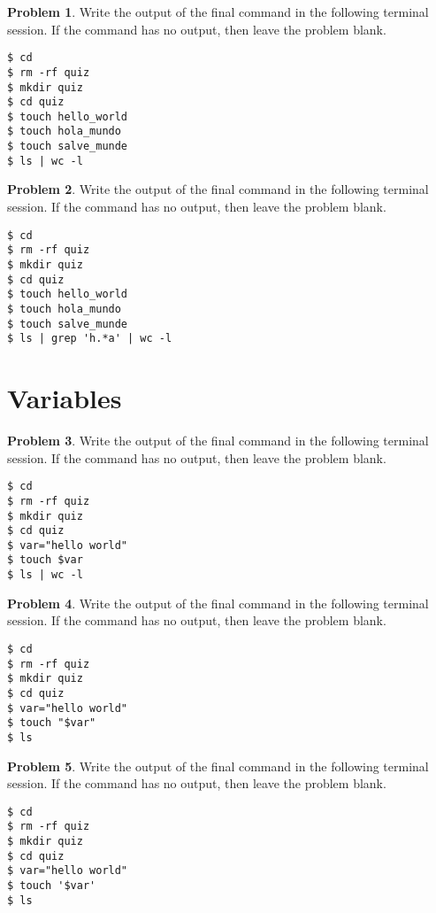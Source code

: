 \documentclass[10pt]{article}
\theoremstyle{definition}
\newtheorem{problem}{Problem}
\begin{document}
\begin{problem}
    Write the output of the final command in the following terminal session.
    If the command has no output, then leave the problem blank.
\end{problem}
\begin{lstlisting}
$ cd
$ rm -rf quiz
$ mkdir quiz
$ cd quiz
$ touch hello_world
$ touch hola_mundo
$ touch salve_munde
$ ls | wc -l
\end{lstlisting}
\vspace{0.4in}

\begin{problem}
    Write the output of the final command in the following terminal session.
    If the command has no output, then leave the problem blank.
\end{problem}
\begin{lstlisting}
$ cd
$ rm -rf quiz
$ mkdir quiz
$ cd quiz
$ touch hello_world
$ touch hola_mundo
$ touch salve_munde
$ ls | grep 'h.*a' | wc -l
\end{lstlisting}
\vspace{0.4in}

\newpage
\section{Variables}

\begin{problem}
    Write the output of the final command in the following terminal session.
    If the command has no output, then leave the problem blank.
\end{problem}
\begin{lstlisting}
$ cd
$ rm -rf quiz
$ mkdir quiz
$ cd quiz
$ var="hello world"
$ touch $var
$ ls | wc -l
\end{lstlisting}
\vspace{0.4in}


\begin{problem}
    Write the output of the final command in the following terminal session.
    If the command has no output, then leave the problem blank.
\end{problem}
\begin{lstlisting}
$ cd
$ rm -rf quiz
$ mkdir quiz
$ cd quiz
$ var="hello world"
$ touch "$var"
$ ls
\end{lstlisting}
\vspace{0.4in}


\begin{problem}
    Write the output of the final command in the following terminal session.
    If the command has no output, then leave the problem blank.
\end{problem}
\begin{lstlisting}
$ cd
$ rm -rf quiz
$ mkdir quiz
$ cd quiz
$ var="hello world"
$ touch '$var'
$ ls
\end{lstlisting}
\vspace{0.4in}
\end{document}

